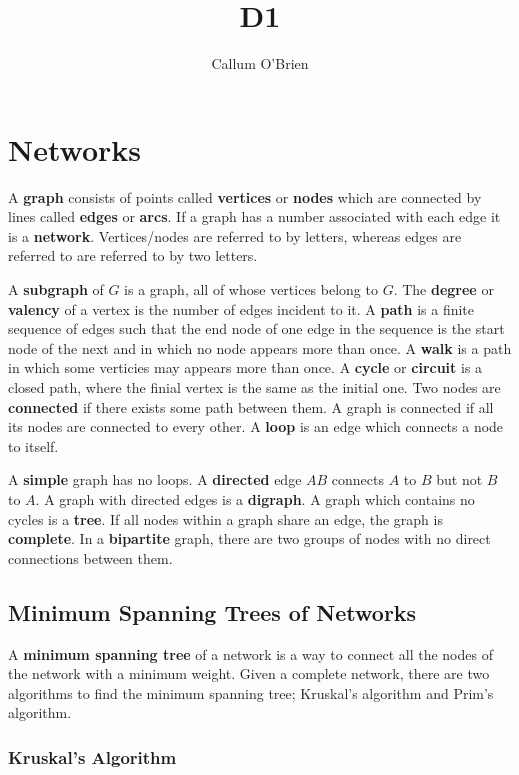 \documentclass{article}
\title{D1}
\author{Callum O'Brien}
\date{}
\begin{document}
\maketitle
\tableofcontents
\newpage

\section{Networks}

A \textbf{graph} consists of points called \textbf{vertices} or \textbf{nodes} which are connected by lines called \textbf{edges} or \textbf{arcs}. If a graph has a number associated with each edge it is a \textbf{network}. Vertices/nodes are referred to by letters, whereas edges are referred to are referred to by two letters.

A \textbf{subgraph} of $G$ is a graph, all of whose vertices belong to $G$. The \textbf{degree} or \textbf{valency} of a vertex is the number of edges incident to it. A \textbf{path} is a finite sequence of edges such that the end node of one edge in the sequence is the start node of the next and in which no node appears more than once. A \textbf{walk} is a path in which some verticies may appears more than once. A \textbf{cycle} or \textbf{circuit} is a closed path, where the finial vertex is the same as the initial one. Two nodes are \textbf{connected} if there exists some path between them. A graph is connected if all its nodes are connected to every other. A \textbf{loop} is an edge which connects a node to itself.

A \textbf{simple} graph has no loops. A \textbf{directed} edge $AB$ connects $A$ to $B$ but not $B$ to $A$. A graph with directed edges is a \textbf{digraph}. A graph which contains no cycles is a \textbf{tree}. If all nodes within a graph share an edge, the graph is \textbf{complete}. In a \textbf{bipartite} graph, there are two groups of nodes with no direct connections between them.

\subsection{Minimum Spanning Trees of Networks}

A \textbf{minimum spanning tree} of a network is a way to connect all the nodes of the network with a minimum weight. Given a complete network, there are two algorithms to find the minimum spanning tree; Kruskal's algorithm and Prim's algorithm.

\subsubsection{Kruskal's Algorithm}
\end{document}
